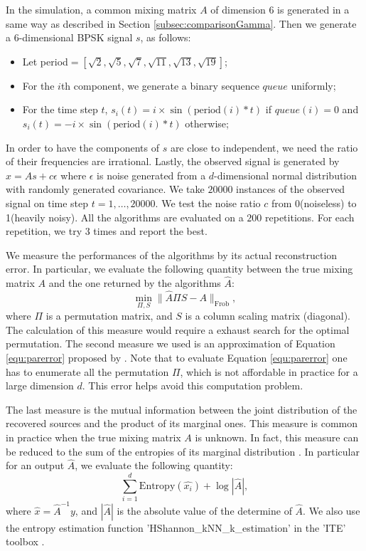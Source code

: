 \documentclass[twoside]{article}
\theoremstyle{definition}
\begin{document}
In the simulation, a common mixing matrix $A$ of dimension 6 is generated in a same way as described in Section \ref{subsec:comparisonGamma}. 
Then we generate a $6$-dimensional BPSK signal $s$, as follows: 
\begin{itemize}
\vspace{-3mm}
\item Let period$=[\sqrt{2},\sqrt{5},\sqrt{7},\sqrt{11},\sqrt{13},\sqrt{19}]$;
\item For the $i$th component, we generate a binary sequence $queue$ uniformly;
\item For the time step $t$, $s_i(t) = i\times\sin (\text{period}(i)*t)$ if $queue(i) = 0$ and $s_i(t) = -i\times\sin (\text{period}(i)*t)$ otherwise;
\end{itemize}
\vspace{-1mm}  
In order to have the components of $s$ are close to independent, we need the ratio of their frequencies are irrational. 
Lastly, the observed signal is generated by $x = As+c\epsilon$ where $\epsilon$ is noise generated from a $d$-dimensional normal distribution with randomly generated covariance. 
We take $20000$ instances of the observed signal on time step $t= 1,\ldots, 20000$.
We test the noise ratio $c$ from 0(noiseless) to 1(heavily noisy). 
All the algorithms are evaluated on a $200$ repetitions. For each repetition, we try $3$ times and report the best.

We measure the performances of the algorithms by its actual reconstruction error.
In particular, we evaluate the following quantity between the true mixing matrix $A$ and the one returned by the algorithms $\widehat{A}$:
\begin{equation}
\label{equ:parerror}
\min_{\Pi,S} \|\widehat{A}\Pi S - A\|_{\text{Frob}},
\end{equation}
where $\Pi$ is a permutation matrix, and $S$ is a column scaling matrix (diagonal).
The calculation of this measure would require a exhaust search for the optimal permutation.
The second measure we used is an approximation of Equation \eqref{equ:parerror} proposed by \citet{comon1994independent}. 
Note that to evaluate Equation \eqref{equ:parerror} one has to enumerate all the permutation $\Pi$, which is not affordable in practice for a large dimension $d$. 
This error helps avoid this computation problem. 

The last measure is the mutual information between the joint distribution of the recovered sources and the product of its marginal ones. 
This measure is common in practice when the true mixing matrix $A$ is unknown. 
In fact, this measure can be reduced to the sum of the entropies of its marginal distribution \citep{Learned-Miller:2003:IUS:945365.964306}. 
In particular for an output $\widehat{A}$, we evaluate the following quantity:
\begin{equation}
\sum_{i = 1}^{d} \text{Entropy}(\widehat{x_i}) + \log |\widehat{A}|,
\end{equation}
where $\widehat{x} = \widehat{A}^{-1}y$, and $|\widehat{A}|$ is the absolute value of the determine of $\widehat{A}$. We also use the entropy estimation function 'HShannon\_kNN\_k\_estimation' in the 'ITE' toolbox \citep{szabo14information}. 
\fi
\end{document}

